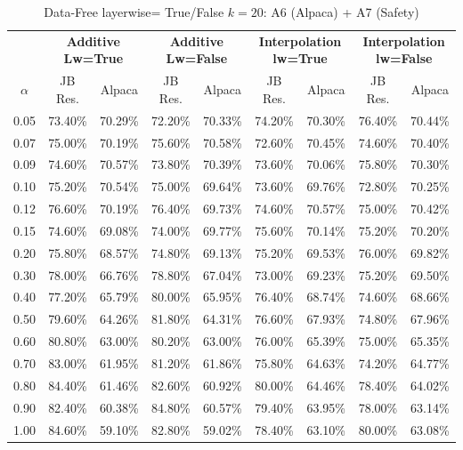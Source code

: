 \begin{table}[h]
\centering
\caption{Data-Free layerwise= True/False $k=20$: A6 (Alpaca) + A7 (Safety)}
\label{tab:res_a6_data_free_20}
\begin{tabular}{c|cc|cc|cc|cc}
\hline
 & \multicolumn{2}{c|}{\textbf{Additive Lw=True}} & \multicolumn{2}{c|}{\textbf{Additive Lw=False}} & \multicolumn{2}{c|}{\textbf{Interpolation lw=True}}& \multicolumn{2}{c}{\textbf{Interpolation lw=False}} \\
$\alpha$ & JB Res. & Alpaca & JB Res. & Alpaca & JB Res. & Alpaca & JB Res. & Alpaca \\
\hline
0.05 & 73.40\% & 70.29\% & 72.20\% & 70.33\% & 74.20\% & 70.30\% & 76.40\% & 70.44\% \\
0.07 & 75.00\% & 70.19\% & 75.60\% & 70.58\% & 72.60\% & 70.45\% & 74.60\% & 70.40\% \\
0.09 & 74.60\% & 70.57\% & 73.80\% & 70.39\% & 73.60\% & 70.06\% & 75.80\% & 70.30\% \\
0.10 & 75.20\% & 70.54\% & 75.00\% & 69.64\% & 73.60\% & 69.76\% & 72.80\% & 70.25\% \\
0.12 & 76.60\% & 70.19\% & 76.40\% & 69.73\% & 74.60\% & 70.57\% & 75.00\% & 70.42\% \\
0.15 & 74.60\% & 69.08\% & 74.00\% & 69.77\% & 75.60\% & 70.14\% & 75.20\% & 70.20\% \\
0.20 & 75.80\% & 68.57\% & 74.80\% & 69.13\% & 75.20\% & 69.53\% & 76.00\% & 69.82\% \\
0.30 & 78.00\% & 66.76\% & 78.80\% & 67.04\% & 73.00\% & 69.23\% & 75.20\% & 69.50\% \\
0.40 & 77.20\% & 65.79\% & 80.00\% & 65.95\% & 76.40\% & 68.74\% & 74.60\% & 68.66\% \\
0.50 & 79.60\% & 64.26\% & 81.80\% & 64.31\% & 76.60\% & 67.93\% & 74.80\% & 67.96\% \\
0.60 & 80.80\% & 63.00\% & 80.20\% & 63.00\% & 76.00\% & 65.39\% & 75.00\% & 65.35\% \\
0.70 & 83.00\% & 61.95\% & 81.20\% & 61.86\% & 75.80\% & 64.63\% & 74.20\% & 64.77\% \\
0.80 & 84.40\% & 61.46\% & 82.60\% & 60.92\% & 80.00\% & 64.46\% & 78.40\% & 64.02\% \\
0.90 & 82.40\% & 60.38\% & 84.80\% & 60.57\% & 79.40\% & 63.95\% & 78.00\% & 63.14\% \\
1.00 & 84.60\% & 59.10\% & 82.80\% & 59.02\% & 78.40\% & 63.10\% & 80.00\% & 63.08\% \\
\hline
\end{tabular}
\end{table}
\FloatBarrier


